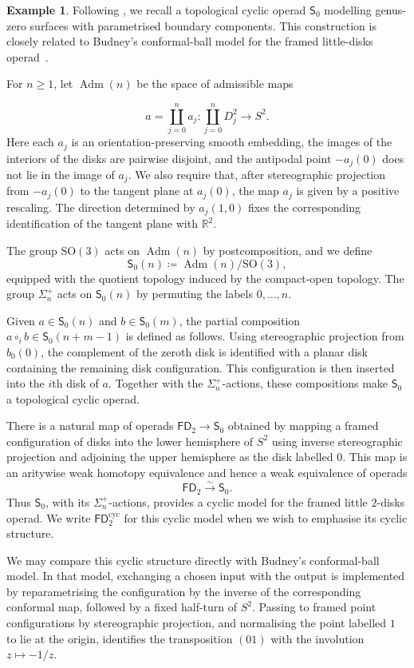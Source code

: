 \documentclass{amsart}
\theoremstyle{definition}
\newtheorem{example}[theorem]{Example}%
\numberwithin{equation}{section}
\begin{document}
\begin{example}
\label{ex: Budney}
Following \cite[Section~5.2]{cyclic_ribbon}, we recall a topological
cyclic operad $\mathsf{S}_0$ modelling genus-zero surfaces with
parametrised boundary components. This construction is closely
related to Budney's conformal-ball model for the framed little-disks
operad~\cite{Budney}.

For $n\geq 1$, let $\operatorname{Adm}(n)$ be the space of admissible maps

\[
a=\coprod_{j=0}^n a_j\colon
\coprod_{j=0}^n D_j^2\longrightarrow S^2.
\]
Here each $a_j$ is an orientation-preserving smooth embedding, the
images of the interiors of the disks are pairwise disjoint, and the
antipodal point $-a_j(0)$ does not lie in the image of $a_j$. We also
require that, after stereographic projection from $-a_j(0)$ to the
tangent plane at $a_j(0)$, the map $a_j$ is given by a positive
rescaling. The direction determined by $a_j(1,0)$ fixes
the corresponding identification of the tangent plane with
$\mathbb{R}^2$.

The group $\mathrm{SO}(3)$ acts on $\operatorname{Adm}(n)$ by
postcomposition, and we define
\[
\mathsf{S}_0(n)\coloneqq
\operatorname{Adm}(n)/\mathrm{SO}(3),
\]
equipped with the quotient topology induced by the compact-open
topology. The group $\Sigma_n^+$ acts on $\mathsf{S}_0(n)$ by
permuting the labels $0,\ldots,n$.

Given $a\in\mathsf{S}_0(n)$ and $b\in\mathsf{S}_0(m)$, the partial
composition $a\circ_i b\in\mathsf{S}_0(n+m-1)$ is defined as follows.
Using stereographic projection from $b_0(0)$, the complement of the
zeroth disk is identified with a planar disk containing the remaining
disk configuration. This configuration is then inserted into the
$i$th disk of $a$. Together with the $\Sigma_n^+$-actions, these
compositions make $\mathsf{S}_0$ a topological cyclic operad.

There is a natural map of operads
$\mathsf{FD}_2\to\mathsf{S}_0$ obtained by mapping a framed
configuration of disks into the lower hemisphere of $S^2$ using
inverse stereographic projection and adjoining the upper hemisphere
as the disk labelled $0$. This map is an aritywise weak homotopy
equivalence and hence a weak equivalence of operads
\[
\mathsf{FD}_2\xrightarrow{\sim}\mathsf{S}_0.
\]
Thus $\mathsf{S}_0$, with its $\Sigma_n^+$-actions, provides a cyclic
model for the framed little $2$-disks operad. We write
$\mathsf{FD}_2^{\mathrm{cyc}}$ for this cyclic model when we wish to
emphasise its cyclic structure.

We may compare this cyclic structure directly with Budney's
conformal-ball model. In that model, exchanging a chosen input with
the output is implemented by reparametrising the configuration by the
inverse of the corresponding conformal map, followed by a fixed
half-turn of $S^2$. Passing to framed point configurations by
stereographic projection, and normalising the point labelled $1$ to
lie at the origin, identifies the transposition $(01)$ with the
involution $z\longmapsto-1/z$.
\end{example}
\end{document}
